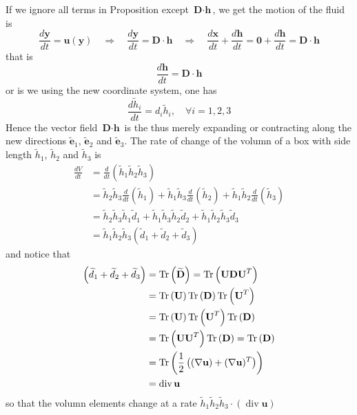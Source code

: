 If we ignore all terms in Proposition except $\textbf{D}\cdot \textbf{h}$, we get the motion of the fluid is 
\begin{equation}
\frac{d\textbf{y}}{dt} = \textbf{u}(\textbf{y})
\quad\Rightarrow\quad
\frac{d\textbf{y}}{dt} = \textbf{D}\cdot\textbf{h}
\quad\Rightarrow\quad
\frac{d\textbf{x}}{dt} + \frac{d\textbf{h}}{dt}= \textbf{0} + \frac{d\textbf{h}}{dt} = \textbf{D}\cdot\textbf{h}
\end{equation}
that is 
\begin{equation}
\frac{d\textbf{h}}{dt} = \textbf{D}\cdot\textbf{h}
\end{equation}
or is we using the new coordinate system, one has
\begin{equation}
\frac{d\widetilde{h}_i}{dt} = d_i\widetilde{h}_i,\quad \forall i=1,2,3
\end{equation}
Hence the vector field $\textbf{D}\cdot\textbf{h}$ is the thus merely expanding or contracting along the new directions $\widetilde{\textbf{e}}_1$, $\widetilde{\textbf{e}}_2$ and $\widetilde{\textbf{e}}_3$. The rate of change of the volumn of a box with side length $\widetilde{h}_1$, $\widetilde{h}_2$ and $\widetilde{h}_3$ is 
\begin{equation}
\begin{aligned}
\frac{dV}{dt}
&= \frac{d}{dt}\left(\widetilde{h}_1\widetilde{h}_2\widetilde{h}_3\right) \\
&= \widetilde{h}_2\widetilde{h}_3\frac{d}{dt}\left(\widetilde{h}_1\right)
+ \widetilde{h}_1\widetilde{h}_3\frac{d}{dt}\left(\widetilde{h}_2\right)
+ \widetilde{h}_1\widetilde{h}_2\frac{d}{dt}\left(\widetilde{h}_3\right)\\
&= \widetilde{h}_2\widetilde{h}_3\widetilde{h}_1 \widetilde{d}_1
+ \widetilde{h}_1\widetilde{h}_3\widetilde{h}_2 \widetilde{d}_2
+ \widetilde{h}_1\widetilde{h}_2\widetilde{h}_3 \widetilde{d}_3\\
&= \widetilde{h}_1\widetilde{h}_2\widetilde{h}_3 \left(\widetilde{d}_1+\widetilde{d}_2+\widetilde{d}_3\right)
\end{aligned}
\end{equation}
and notice that 
\begin{equation}
\begin{aligned}
\left(\widetilde{d}_1+\widetilde{d}_2+\widetilde{d}_3\right)
&= \Tr\left(\widetilde{\textbf{D}}\right)
=\Tr\left(\textbf{U}\textbf{D}\textbf{U}^{T}\right)\\
&= \Tr\left(\textbf{U}\right)\Tr\left(\textbf{D}\right)\Tr\left(\textbf{U}^{T}\right)\\
&= \Tr\left(\textbf{U}\right)\Tr\left(\textbf{U}^{T}\right)\Tr\left(\textbf{D}\right)\\
&= \Tr\left(\textbf{U}\textbf{U}^{T}\right)\Tr\left(\textbf{D}\right)
= \Tr\left(\textbf{D}\right)\\
&= \Tr\left(\frac{1}{2}\left((\nabla \textbf{u}) + (\nabla \textbf{u})^{T}\right)\right)\\
&= \operatorname{div}\textbf{u}
\end{aligned}
\end{equation}
so that the volumn elements change at a rate $\widetilde{h}_1\widetilde{h}_2\widetilde{h}_3 \cdot(\operatorname{div}\textbf{u})$


